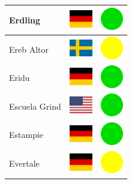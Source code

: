 \documentclass[12pt, a4paper, twoside]{report}
\begin{document}
\begin{center}
\begin{longtable}{|p{5cm}|p{2cm}|p{2cm}|}
 Erdling                                                    & \includegraphics[width=1cm]{4x3/de} &   \includegraphics[width=1cm]{likes/y} \\ \hline
 Ereb Altor                                                 & \includegraphics[width=1cm]{4x3/se} &   \includegraphics[width=1cm]{likes/m} \\ \hline
 Eridu                                                      & \includegraphics[width=1cm]{4x3/de} &   \includegraphics[width=1cm]{likes/y} \\ \hline
 Escuela Grind                                              & \includegraphics[width=1cm]{4x3/us} &   \includegraphics[width=1cm]{likes/y} \\ \hline
 Estampie                                                   & \includegraphics[width=1cm]{4x3/de} &   \includegraphics[width=1cm]{likes/y} \\ \hline
 Evertale                                                   & \includegraphics[width=1cm]{4x3/de} &   \includegraphics[width=1cm]{likes/m} \\ \hline

\end{longtable}
\end{center}
\end{document}
